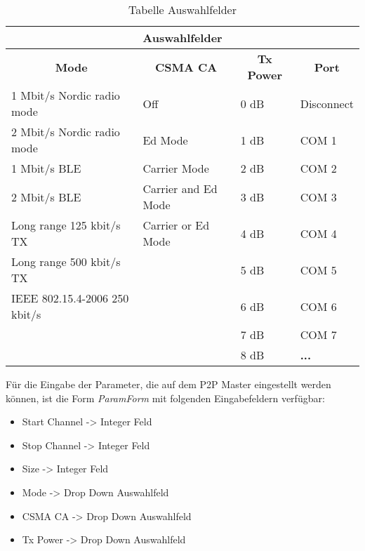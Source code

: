 \begin{table}[h]
\centering
\begin{tabular}{|l|l|l|l|} 
\hline
\multicolumn{4}{|c|}{\textbf{Auswahlfelder} } \\ 
\hline
\multicolumn{1}{|c|}{\textbf{Mode} } & \multicolumn{1}{c|}{\textbf{CSMA CA} } & \multicolumn{1}{c|}{\textbf{Tx Power} } & \multicolumn{1}{c|}{\textbf{Port} } \\ 
\hline
1 Mbit/s Nordic radio mode & Off & 0 dB & Disconnect \\ 
\hline
2 Mbit/s Nordic radio mode & Ed Mode & 1 dB & COM 1 \\ 
\hline
1 Mbit/s BLE & Carrier Mode & 2 dB & COM 2 \\ 
\hline
2 Mbit/s BLE & Carrier and Ed Mode & 3 dB & COM 3 \\ 
\hline
Long range 125 kbit/s TX & Carrier or Ed Mode & 4 dB & COM 4 \\ 
\hline
Long range 500 kbit/s TX &  & 5 dB & COM 5 \\ 
\cline{1-1}\cline{3-4}
IEEE 802.15.4-2006 250 kbit/s &  & 6 dB & COM 6 \\ 
\cline{1-1}\cline{3-4}
\multicolumn{1}{l}{} &  & 7 dB & COM 7 \\ 
\cline{3-4}
\multicolumn{1}{l}{} &  & 8 dB & \textbf{...}  \\
\cline{3-4}
\end{tabular}
\caption{Tabelle Auswahlfelder}
\label{table:TabelleAuswahlfelder}
\end{table}


Für die Eingabe der Parameter, die auf dem P2P Master eingestellt werden können, ist die Form \textit{ParamForm} mit folgenden Eingabefeldern verfügbar:
\begin{itemize}
	\item Start Channel \hspace{5mm} -> Integer Feld
	\item Stop Channel \hspace{6mm} -> Integer Feld
	\item Size \hspace{22.3mm} -> Integer Feld
	\item Mode \hspace{19.5mm} -> Drop Down Auswahlfeld
	\item CSMA CA \hspace{10.5mm} -> Drop Down Auswahlfeld
	\item Tx Power \hspace{13mm} -> Drop Down Auswahlfeld
\end{itemize}

